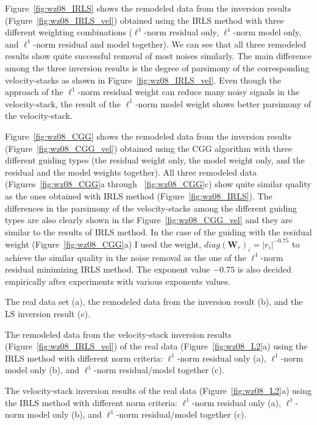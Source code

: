 Figure~\ref{fig:wz08_IRLS} shows the remodeled data
from the inversion results (Figure~\ref{fig:wz08_IRLS_vel}) obtained using the IRLS method 
with three different weighting combinations ($\ell^1$-norm residual only, $\ell^1$-norm model only,
and $\ell^1$-norm residual and model together).
We can see that all three remodeled results show quite successful removal of most noises similarly.
The main difference among the three inversion results is the degree of parsimony 
of the corresponding velocity-stacks as shown in Figure~\ref{fig:wz08_IRLS_vel}.
Even though the approach of the $\ell^1$-norm residual weight can reduce many noisy signals in 
the velocity-stack, the result of the $\ell^1$-norm model weight shows better parsimony of the velocity-stack.

Figure~\ref{fig:wz08_CGG} shows the remodeled data
from the inversion results (Figure~\ref{fig:wz08_CGG_vel})
obtained using the CGG algorithm with three different guiding types
(the residual weight only, the model weight only,
and the residual and the model weights together).
All three remodeled data (Figures~\ref{fig:wz08_CGG}a through ~\ref{fig:wz08_CGG}c)
show quite similar quality as the ones obtained with IRLS method (Figure~\ref{fig:wz08_IRLS}).
The differences in the parsimony of the velocity-stacks 
among the different guiding types are also clearly shown 
in the Figure~\ref{fig:wz08_CGG_vel} and they are similar to the results of IRLS method.
In the case of the guiding with the residual weight (Figure~\ref{fig:wz08_CGG}a)
I used the weight, $diag({\mathbf W_r})_i = |r_i|^{-0.75}$ to achieve 
the similar quality in the noise removal as the one of the $\ell^1$-norm residual minimizing IRLS method.
The exponent value $-0.75$ is also decided empirically after experiments with various exponents values.

{The real data set (a), the remodeled data from the inversion result (b), and the LS inversion result (c).}

{The remodeled data from the velocity-stack inversion results (Figure~\protect\ref{fig:wz08_IRLS_vel}) 
of the real data (Figure~\protect\ref{fig:wz08_L2}a) using the IRLS method with
different norm criteria: $\ell^1$-norm residual only (a), $\ell^1$-norm model only (b),
and $\ell^1$-norm residual/model together (c).}

{The velocity-stack inversion results of the real data 
(Figure~\protect\ref{fig:wz08_L2}a) using the IRLS method with
different norm criteria: $\ell^1$-norm residual only (a), $\ell^1$-norm model only (b),
and $\ell^1$-norm residual/model together (c).}

